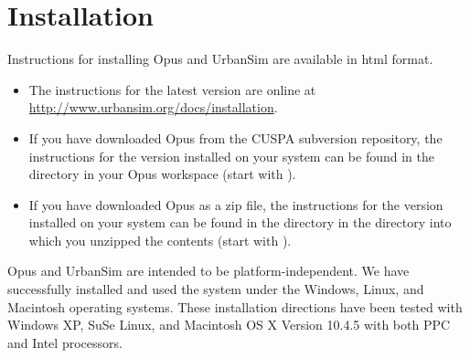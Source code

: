 

\chapter{Installation}
\label{chapter:installation}


Instructions for installing Opus and UrbanSim are available in html
format.  

\begin{itemize}

\item The instructions for the latest version are online at
\url{http://www.urbansim.org/docs/installation}.

\item If you have downloaded Opus from the CUSPA subversion repository, the
instructions for the version installed on your system can be found in the
directory  in your Opus workspace (start
with ).

\item If you have downloaded Opus as a zip file, the instructions for the
version installed on your system can be found in the directory
 in the directory into which you unzipped the
contents (start with ).

\end{itemize}

Opus and UrbanSim are intended to be platform-independent.
 We have successfully installed and used the
system under the Windows, \windowsindex Linux, \linuxindex and Macintosh
\macintoshindex operating systems. These installation directions have been
tested with Windows XP, \windowstestindex SuSe Linux, \suseindex
\linuxtestindex and Macintosh OS X Version 10.4.5 \macintoshtestindex with both
PPC  and Intel \intelindex{} processors.

